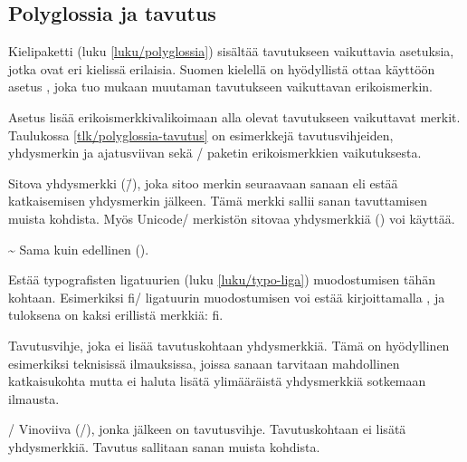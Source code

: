 \subsection{Polyglossia ja tavutus}
\label{luku/tavutus-polyglossia}

Kielipaketti  (luku \ref{luku/polyglossia})
sisältää tavutukseen vaikuttavia asetuksia, jotka ovat eri kielissä
erilaisia. Suomen kielellä on hyödyllistä ottaa käyttöön asetus
, joka tuo mukaan muutaman tavutukseen
vaikuttavan erikoismerkin.

\begin{koodilohkosis}
\setdefaultlanguage[babelshorthands]{finnish}
\end{koodilohkosis}

\noindent
Asetus  lisää erikoismerkkivalikoimaan alla
olevat tavutukseen vaikuttavat merkit. Taulukossa
\ref{tlk/polyglossia-tavutus} on esimerkkejä tavutusvihjeiden,
yhdysmerkin ja ajatusviivan sekä \-/ paketin
erikoismerkkien vaikutuksesta.

\newcommand{\shorthandsyhdysmerkki}{%
\item [\textquotedbl-] Sitova yhdysmerkki (\=/), joka sitoo merkin
  seuraavaan sanaan eli estää katkaisemisen yhdysmerkin jälkeen. Tämä
  merkki sallii sanan tavuttamisen muista kohdista. Myös Unicode\-/
  merkistön sitovaa yhdysmerkkiä (\uctunnus{u+2011 non\-/ breaking
    hyphen}) voi käyttää.}

\newcommand{\shorthandspystyviiva}{%
\item [\textquotedbl|] Estää typografisten ligatuurien (luku
  \ref{luku/typo-liga}) muodostumisen tähän kohtaan. Esimerkiksi fi\-/
  ligatuurin muodostumisen voi estää kirjoittamalla \koodi{f"|i}, ja
  tuloksena on kaksi erillistä merkkiä: f\textcompwordmark i.}

\newcommand{\shorthandslainausmerkki}{%
\item [\textquotedbl\textquotedbl] Tavutusvihje, joka ei lisää
  tavutuskohtaan yhdysmerkkiä. Tämä on hyödyllinen esimerkiksi
  teknisissä ilmauksissa, joissa sanaan tarvitaan mahdollinen
  katkaisukohta mutta ei haluta lisätä ylimääräistä yhdysmerkkiä
  sotkemaan ilmausta.}

\begin{maaritelma}{}
  \shorthandsyhdysmerkki

\item [\textquotedbl\textasciitilde] Sama kuin edellinen
  (\koodi{\textquotedbl-}).

  \shorthandspystyviiva

  \shorthandslainausmerkki

\item [\textquotedbl/] Vinoviiva (/), jonka jälkeen on tavutusvihje.
  Tavutuskohtaan ei lisätä yhdysmerkkiä. Tavutus sallitaan sanan muista
  kohdista.
\end{maaritelma}

